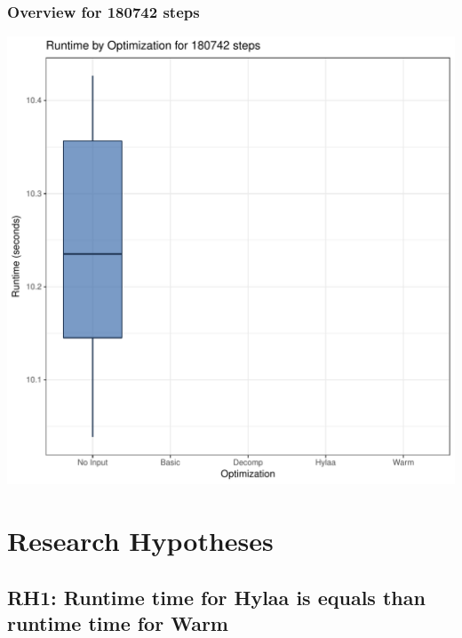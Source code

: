 \documentclass{article}\usepackage[]{graphicx}\usepackage[]{color}
\makeatletter
\def\maxwidth{ %
  \ifdim\Gin@nat@width>\linewidth
    \linewidth
  \else
    \Gin@nat@width
  \fi
}
\newenvironment{knitrout}{}{} %
\makeatother
\begin{document}
\subsubsection{Overview for 180742 steps}
\begin{knitrout}
\color{fgcolor}
\includegraphics[width=\maxwidth]{figure/steps180742-1} 

\end{knitrout}

\section{Research Hypotheses}

\subsection{RH1: Runtime time for Hylaa is equals than runtime time for Warm}
\end{document}
